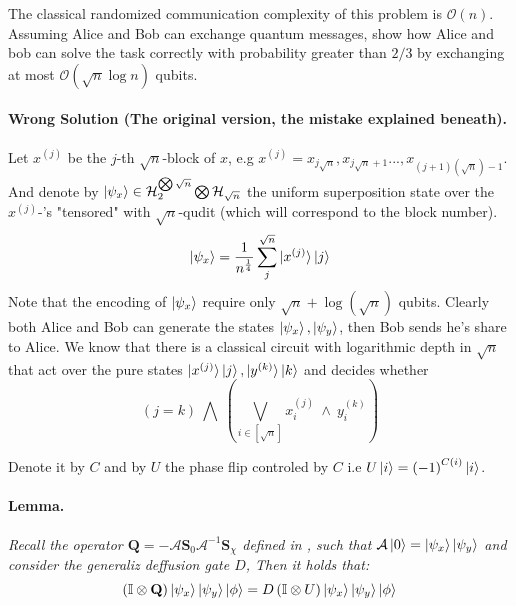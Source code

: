 \documentclass{article}
\newcommand{\onotation}[1]{\(\mathcal{O} \left( {#1}  \right) \)}
\newcommand{\ona}[1]{\onotation{#1}}
\begin{document}
\begin{multicols*}{2}
The classical randomized communication complexity of this problem is \ona{n}.
Assuming Alice and Bob can exchange quantum messages, show how Alice and bob can solve the task
correctly with probability greater than \(2/3\) by exchanging at most \ona{\sqrt{n}\log n } qubits.


\paragraph{Wrong Solution (The original version, the mistake explained beneath).}
Let \( x^{(j)} \) be the \(j\)-th \(\sqrt{n}\)-block of \(x\), e.g \(x^{(j)} = x_{j\sqrt{n}},x_{j\sqrt{n}+1}...,x_{(j+1)(\sqrt{n})-1}  \). And denote by \( \ket{\psi_x} \in \mathcal{H}_{2}^{\bigotimes \sqrt{n}} \bigotimes \mathcal{H}_{\sqrt{n}} \) the uniform superposition state over the \( x^{(j)}\)-'s "tensored" with \(\sqrt{n}\)-qudit (which will correspond to the block number). 
\[ \ket{\psi_x} = \frac{1}{n^\frac{1}{4}}\sum_{j}^{\sqrt{n}}\ket{x^{(j)}}\ket{j} \] Note that the encoding of \( \ket{\psi_x} \) require only \( \sqrt{n} + \log(\sqrt{n}) \) qubits.
Clearly both Alice and Bob can generate the states \( \ket{\psi_x}, \ket{\psi_y} \), then Bob sends he's share to Alice.
We know that there is a classical circuit with logarithmic depth in \( \sqrt{n} \) that act over the pure states \( \ket{x^{(j)}}\ket{j} , \ket{y^{(k)}}\ket{k} \) and decides whether \[ \left( j =  k \right) \ \bigwedge  \ \left( \bigvee_{i \in [ \sqrt{n} ] } x^{(j)}_{i} \ \wedge \  y^{(k)}_{i} \right)   \]


Denote it by \( C \) and by \( U \) the phase flip controled by $C$ i.e $U\ket{i}=\left( -1 \right)^{C\left( i \right)}\ket{i}$.

\paragraph{Lemma.} \textit{ Recall the operator $\mathbf Q  = - {\mathcal A}  {\mathbf S}_0 
  {\mathcal A}^{-1}  {\mathbf S}_\chi$ defined in \cite{Brassard_2002}, such that $ \mathcal A \ket{0} = \ket{\psi_{x}}\ket{\psi_{y}}$ and 
consider the generaliz deffusion gate $D$, Then it holds that:}
\begin{equation*}
  \left(  \mathbb{I} \otimes \mathbf Q \right) \ket{\psi_{x}}\ket{\psi_{y}} \ket{\phi} =  D \left( \mathbb{I} \otimes U \right)  \ket{\psi_{x}}\ket{\psi_{y}} \ket{\phi} 
\end{equation*}



\end{multicols*}
\end{document}
